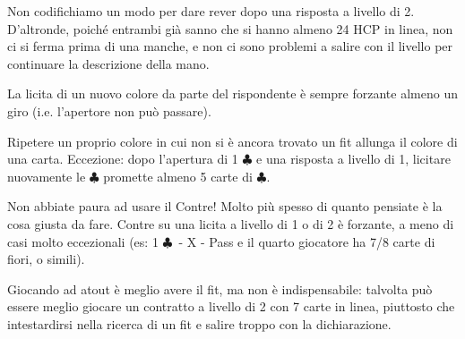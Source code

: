 \documentclass[a4paper,10pt]{article}
\renewcommand{\c}{$\clubsuit$\xspace}
\newcommand{\smallspace}{\vskip0.3cm}
\begin{document}
\indent

Non codifichiamo un modo per dare rever dopo una risposta a livello di 2. D'altronde, poiché entrambi già sanno che si hanno almeno 24 HCP in linea, non ci si ferma prima di una manche, e non ci sono problemi a salire con il livello per continuare la descrizione della mano.

\smallspace

La licita di un nuovo colore da parte del rispondente è sempre forzante almeno un giro (i.e. l'apertore non può passare).

\smallspace

Ripetere un proprio colore in cui non si è ancora trovato un fit allunga il colore di una carta. Eccezione: dopo l'apertura di 1 \c e una risposta a livello di 1, licitare nuovamente le \c promette almeno 5 carte di \c.

\smallspace

Non abbiate paura ad usare il Contre! Molto più spesso di quanto pensiate è la cosa giusta da fare. Contre su una licita a livello di 1 o di 2 è forzante, a meno di casi molto eccezionali (es: 1 \c\ - X - Pass e il quarto giocatore ha 7/8 carte di fiori, o simili).

\smallspace

Giocando ad atout è meglio avere il fit, ma non è indispensabile: talvolta può essere meglio giocare un contratto a livello di 2 con 7 carte in linea, piuttosto che intestardirsi nella ricerca di un fit e salire troppo con la dichiarazione.
\end{document}

